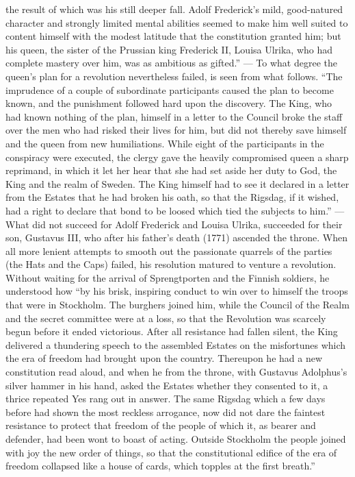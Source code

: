 \documentclass[12pt,a4paper,openany]{book}
\newcommand{\opage}[1]{\marginnote{\footnotesize\textit{[#1]}}}
\begin{document}
the result of which was his still deeper fall. Adolf
Frederick's mild, good-natured character and strongly limited
mental abilities seemed to make him well suited to content himself
with the modest latitude that the constitution granted
him; but his queen, the sister of the Prussian king Frederick
II, Louisa Ulrika, who had complete
mastery over him, was as ambitious
as gifted.'' --- To what degree the queen's plan for
a revolution nevertheless failed, is seen from what follows. ``The
imprudence of a couple of subordinate participants caused
the plan to become known, and the punishment followed hard upon the
discovery. The King, who had known nothing of the plan,
himself in a letter to the Council broke the staff over the
men who had risked their lives for him, but did not thereby save
himself and the queen from new humiliations.
While eight of the participants in the conspiracy were
executed, the clergy gave the heavily compromised
queen a sharp reprimand, in which it let
her hear that she had set aside her duty to God,
the King and the realm of Sweden. The King himself had to see it
declared in a letter from the Estates that he had broken
his oath, so that the Rigsdag, if it wished, had a right to
declare that bond to be loosed which tied the subjects
to him.'' --- What did not succeed for Adolf
Frederick and Louisa Ulrika, succeeded for their son, Gustavus
III, who after his father's death (1771) ascended the throne.
When all more lenient attempts to smooth out the passionate quarrels
of the parties (the Hats and the Caps) failed,
his resolution matured to venture a revolution.
Without waiting for the arrival of Sprengtporten and the Finnish
soldiers, he understood how ``by his brisk, inspiring
\setcounter{footnote}{0}%
\opage{32}conduct to win over to himself the troops that were in Stockholm.
The burghers joined him, while the Council of the Realm
and the secret committee were at a loss, so that the Revolution
was scarcely begun before it ended victorious.
After all resistance had fallen silent, the
King delivered a thundering speech to the assembled Estates on
the misfortunes which the era of freedom had brought upon the country.
Thereupon he had a new constitution read aloud, and when he
from the throne, with Gustavus Adolphus's silver hammer in his hand,
asked the Estates whether they consented to it, a thrice
repeated Yes rang out in answer. The same Rigsdag
which a few days before had shown the most reckless
arrogance, now did not dare the faintest resistance
to protect that freedom of the people of which it,
as bearer and defender, had been wont to boast of acting.
Outside Stockholm the people joined with joy
the new order of things, so that the constitutional edifice of the era of freedom
collapsed like a house of cards, which
topples at the first breath.''
\end{document}
